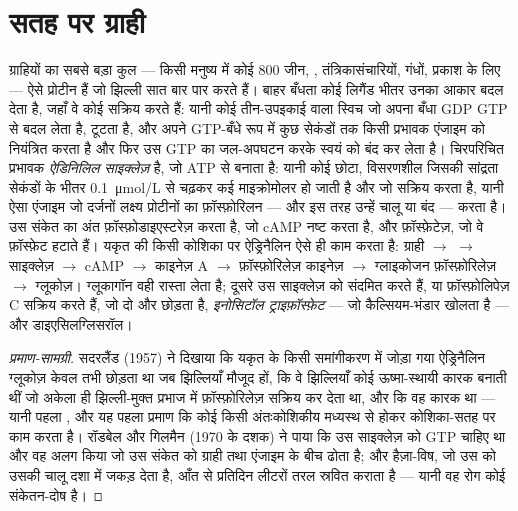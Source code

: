 \section{सतह पर ग्राही}

\begin{proposition}[G-प्रोटीन-युग्मित ग्राही और चक्रीय AMP]\label{prop:b2:cell-signalling:gpcr}
ग्राहियों का सबसे बड़ा कुल --- किसी मनुष्य में कोई \num{800} जीन,
, तंत्रिकासंचारियों, गंधों, प्रकाश के लिए --- ऐसे प्रोटीन हैं जो
झिल्ली सात बार पार करते हैं। बाहर बँधता कोई लिगैंड
भीतर उनका आकार बदल देता है, जहाँ वे कोई \emph{} सक्रिय करते हैं: यानी
कोई तीन-उपइकाई वाला स्विच जो अपना बँधा GDP GTP से बदल लेता है, टूटता है, और
अपने GTP-बँधे रूप में कुछ सेकंडों तक किसी प्रभावक एंजाइम को नियंत्रित करता है
और फिर उस GTP का जल-अपघटन करके स्वयं को बंद कर लेता है। चिरपरिचित
प्रभावक \emph{ऐडिनिलिल साइक्लेज़} है, जो ATP से \emph{}
बनाता है: यानी कोई छोटा, विसरणशील \emph{} जिसकी
सांद्रता सेकंडों के भीतर \qty{0.1}{\micro mol/L} से चढ़कर
कई माइक्रोमोलर हो जाती है और जो \emph{} सक्रिय करता है, यानी
ऐसा एंजाइम जो दर्जनों लक्ष्य प्रोटीनों का फ़ॉस्फ़ोरिलन --- और इस तरह उन्हें चालू या बंद ---
करता है। उस संकेत का अंत फ़ॉस्फ़ोडाइएस्टरेज़ करता है, जो
cAMP नष्ट करता है, और फ़ॉस्फ़ेटेज़, जो वे फ़ॉस्फ़ेट हटाते हैं।
यकृत की किसी कोशिका पर ऐड्रिनैलिन ऐसे ही काम करता है: ग्राही $\to$ 
$\to$ साइक्लेज़ $\to$ cAMP $\to$ काइनेज़ A $\to$ फ़ॉस्फ़ोरिलेज़ काइनेज़
$\to$ ग्लाइकोजन फ़ॉस्फ़ोरिलेज़ $\to$ ग्लूकोज़। ग्लूकागॉन वही
रास्ता लेता है; दूसरे  उस साइक्लेज़ को संदमित करते हैं, या
फ़ॉस्फ़ोलिपेज़ C सक्रिय करते हैं, जो दो और  छोड़ता है,
\emph{इनोसिटॉल ट्राइफ़ॉस्फ़ेट} --- जो कैल्सियम-भंडार खोलता है --- और
डाइएसिलग्लिसरॉल।
\end{proposition}
\begin{proof}[प्रमाण-सामग्री]
सदरलैंड (1957) ने दिखाया कि यकृत के किसी समांगीकरण में जोड़ा गया
ऐड्रिनैलिन ग्लूकोज़ केवल तभी छोड़ता था जब झिल्लियाँ मौजूद हों, कि
वे झिल्लियाँ कोई ऊष्मा-स्थायी कारक बनाती थीं जो अकेला ही
झिल्ली-मुक्त प्रभाज में फ़ॉस्फ़ोरिलेज़ सक्रिय कर देता था, और कि वह कारक
 था --- यानी पहला , और यह पहला
प्रमाण कि कोई  किसी अंतःकोशिकीय मध्यस्थ से होकर
कोशिका-सतह पर काम करता है। रॉडबेल और गिलमैन (1970 के दशक) ने पाया कि
उस साइक्लेज़ को GTP चाहिए था और वह  अलग किया जो उस
संकेत को ग्राही तथा एंजाइम के बीच ढोता है; और हैज़ा-विष, जो उस
 को उसकी चालू दशा में जकड़ देता है, आँत से प्रतिदिन लीटरों तरल
स्रवित कराता है --- यानी वह रोग कोई संकेतन-दोष है।
\end{proof}

